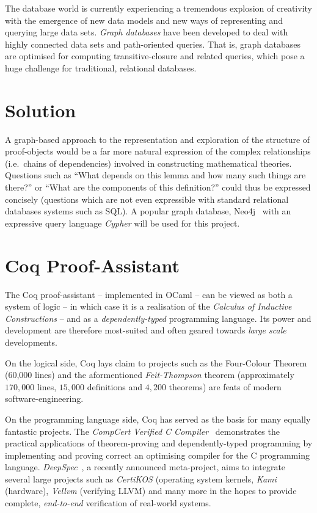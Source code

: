 The database world is currently experiencing a tremendous explosion of creativity
with the emergence of new data models and new ways of representing and querying
large data sets. \emph{Graph databases} have been developed to deal with highly
connected data sets and path-oriented queries. That is, graph databases are
optimised for computing transitive-closure and related queries, which pose a
huge challenge for traditional, relational databases.

\section{Solution}

A graph-based approach to the representation and exploration of the structure of
proof-objects would  be a far more natural expression of the complex
relationships (i.e.\ chains of dependencies) involved in
constructing mathematical theories. Questions such as ``What depends on this
lemma and how many such things are there?'' or ``What are the components of
this definition?'' could thus be expressed concisely (questions which are not
even expressible with standard relational databases systems such as
SQL). A popular graph database, Neo4j~\cite{neo4j} with an expressive query
language \emph{Cypher} will be used for this project.

\section{Coq Proof-Assistant}

The Coq proof-assistant -- implemented in OCaml -- can be viewed as both 
a system of logic -- in which case it is a realisation of the \emph{Calculus of
Inductive Constructions} -- and as a \emph{dependently-typed} programming
language. Its power and development are therefore most-suited and often geared
towards \emph{large scale} developments.

On the logical side, Coq lays claim to projects such as the Four-Colour
Theorem~\cite{gonthier2008formal} (60,000 lines) and the aformentioned
\emph{Feit-Thompson} theorem (approximately $170,000$ lines, $15,000$
definitions and $4,200$ theorems) are feats of modern software-engineering.

On the programming language side, Coq has served as the basis for many equally
fantastic projects. The \emph{CompCert Verified C
Compiler}~\cite{leroy2012compcert} demonstrates the practical applications of
theorem-proving and dependently-typed programming by implementing and proving
correct an optimising compiler for the C programming language.
\emph{DeepSpec}~\cite{pierce2016science}, a recently announced meta-project,
aims to integrate several large projects such as \emph{CertiKOS} (operating
system kernels, \emph{Kami} (hardware), \emph{Vellvm} (verifying LLVM) and many
more in the hopes to provide complete, \emph{end-to-end} verification of
real-world systems.


